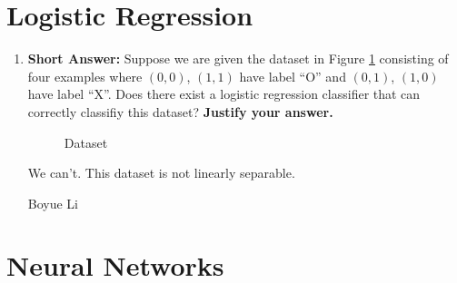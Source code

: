 
\section{Logistic Regression}

\begin{enumerate}
    
    \item \textbf{Short Answer:} Suppose we are given the dataset in Figure \ref{fig:dataxor} consisting of four examples where
    $(0,0)$, $(1, 1)$ have label ``O'' and
    $(0,1)$, $(1, 0)$ have label ``X''.
    Does there exist a logistic regression classifier that can correctly classifiy this dataset? \textbf{Justify your answer.}
    
    \begin{figure}[H]
        \centering
        \caption{Dataset}
        \label{fig:dataxor}
    \end{figure}

    \fillwithlines{6em}
    
    \begin{soln}
    We can't. This dataset is not linearly separable.
    \end{soln}
    
    \begin{qauthor}
    Boyue Li
    \end{qauthor}
    
    
\end{enumerate}

\section{Neural Networks}

